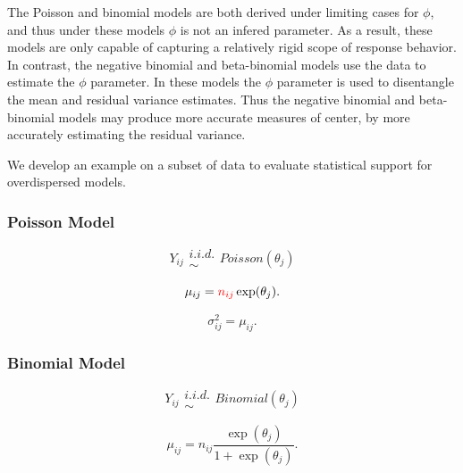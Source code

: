 \documentclass[12pt]{article}
\begin{document}
The Poisson and binomial models are both derived under limiting cases for 
$\phi$, and thus under these models $\phi$ is not an infered parameter. 
As a result, these models are only capable of capturing a relatively rigid 
scope of response behavior. In contrast, the negative binomial and 
beta-binomial models use the data to estimate the $\phi$ parameter. In these 
models the $\phi$ parameter is used to disentangle the mean and residual 
variance estimates. Thus the negative binomial and beta-binomial models may 
produce more accurate measures of center, by more accurately estimating
the residual variance. %

We develop an example on a subset of data to evaluate statistical support for
overdispersed models. 


%
\subsubsection{Poisson Model}

%
\begin{equation}
Y_{ij} \substack{i.i.d.\\\sim} Poisson(\theta_{j})
\end{equation}

\begin{equation}
\mu_{ij} = {\color{red}n_{ij}} \exp(\theta_{j}).
\end{equation}

\begin{equation}
\sigma^2_{ij} = \mu_{ij}.
\end{equation}


%
\subsubsection{Binomial Model}

%
\begin{equation}
Y_{ij} \substack{i.i.d.\\\sim} Binomial(\theta_{j})
\end{equation}

\begin{equation}
\mu_{ij} = n_{ij}\frac{\exp(\theta_{j})}{1+\exp(\theta_{j})}.
\end{equation}
\end{document}
